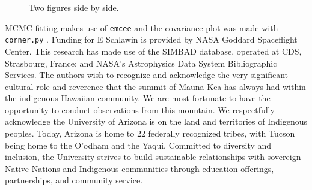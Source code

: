 \documentclass[linenumbers,trackchanges]{aastex701}
\begin{document}
\begin{figure}
\caption{Two figures side by side.\label{fig:gridFig}}
\end{figure}



\begin{acknowledgements}
MCMC fitting makes use of \texttt{emcee} \citep{foreman-mackey2013emcee} and the covariance plot was made with \texttt{corner.py} \citep{foremanCorner}.
Funding for E Schlawin is provided by NASA Goddard Spaceflight Center.
This research has made use of the SIMBAD database, operated at CDS, Strasbourg, France;
and NASA's Astrophysics Data System Bibliographic Services.
The authors wish to recognize and acknowledge the very significant cultural role and reverence that the summit of Mauna Kea has always had within the indigenous Hawaiian community. We are most fortunate to have the opportunity to conduct observations from this mountain.
We respectfully acknowledge the University of Arizona is on the land and territories of Indigenous peoples. Today, Arizona is home to 22 federally recognized tribes, with Tucson being home to the O’odham and the Yaqui. Committed to diversity and inclusion, the University strives to build sustainable relationships with sovereign Native Nations and Indigenous communities through education offerings, partnerships, and community service.  
\end{acknowledgements}


%

\vspace{5mm}

\end{document}
